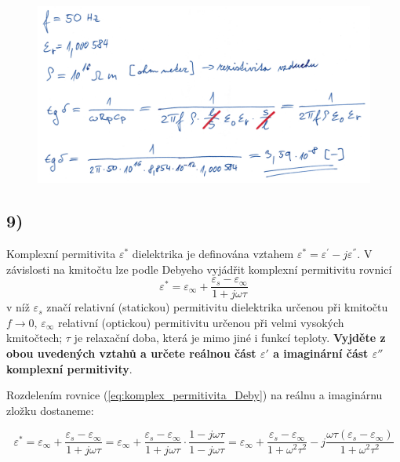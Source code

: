 \begin{figure}[h]
    \centering
    \includegraphics*[width=\textwidth]{images/diel8.jpg}
\end{figure}

\newpage


\subsection*{9)}
Komplexní permitivita $\varepsilon^*$ dielektrika je definována vztahem ${\varepsilon^{*}}={\varepsilon^{'}}-{j\varepsilon^{''}}$. V závislosti na kmitočtu lze podle Debyeho vyjádřit komplexní permitivitu rovnicí
\begin{equation}
    {\varepsilon^{*}}={\varepsilon_\infty}+\frac{{\varepsilon_s}-{\varepsilon_\infty}}{1+j\omega\tau}
    \label{eq:komplex_permitivita_Deby}
\end{equation}
v níž $\varepsilon_s$ značí relativní (statickou) permitivitu dielektrika určenou při kmitočtu $f\rightarrow 0$, $\varepsilon_\infty$ relativní (optickou) permitivitu určenou při velmi vysokých kmitočtech; $\tau$ je relaxační doba, která je mimo jiné i funkcí teploty. \textbf{Vyjděte z obou uvedených vztahů
a určete reálnou část $\varepsilon{'}$ a imaginární část $\varepsilon{''}$ komplexní permitivity}.

Rozdelením rovnice (\ref{eq:komplex_permitivita_Deby}) na reálnu a imaginárnu zložku dostaneme:

\begin{equation*}
    {\varepsilon^{*}}={\varepsilon_\infty}+\frac{{\varepsilon_s}-{\varepsilon_\infty}}{1+j\omega\tau}={\varepsilon_\infty}+\frac{{\varepsilon_s}-{\varepsilon_\infty}}{1+j\omega\tau}\cdot\frac{1-j\omega\tau}{1-j\omega\tau}={\varepsilon_\infty}+\frac{{\varepsilon_s}-{\varepsilon_\infty}}{1+{\omega}^2{\tau}^2}-j \frac{\omega\tau({\varepsilon_s}-{\varepsilon_\infty})}{1+{\omega}^2{\tau}^2}
\end{equation*}

